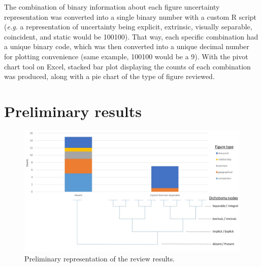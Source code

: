 \documentclass[12pt,a4paper]{article}
\begin{document}
The combination of binary information about each figure uncertainty representation was converted into a single binary number with a custom R script (\textit{e.g.} a representation of uncertainty being explicit, extrinsic, visually separable, coincident, and static would be 100100).
That way, each specific combination had a unique binary code, which was then converted into a unique decimal number for plotting convenience (same example, 100100 would be a 9).%
With the pivot chart tool on Excel, stacked bar plot displaying the counts of each combination was produced, along with a pie chart of the type of figure reviewed.

\section{Preliminary results}

\begin{figure}
\centering
\includegraphics[scale=0.5]{uncertainty_representation_review_fig.jpg}
\caption{Preliminary representation of the review results.}
\label{prelifig}
\end{figure}
\end{document}
